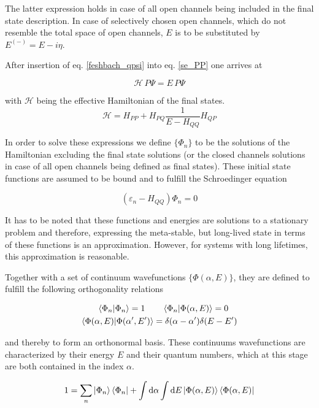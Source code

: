 The latter expression holds in case of all open channels being included
in the final state description.
In case of selectively chosen open channels, which do not resemble the total
space of open channels,
$E$ is to be substituted by $E^{(-)}=E - i\eta$.

After insertion of eq. \ref{feshbach_qpsi} into eq. \ref{se_PP} one arrives at

\begin{equation}
  \mathscr{H} \,P \Psi = E \,P \Psi \label{se_ppsi}
\end{equation}

with $\mathscr{H}$ being the effective Hamiltonian of the final states.
\begin{equation}
  \mathscr{H} = H_{PP} + H_{PQ} \frac{1}{E-H_{QQ}} H_{QP}
\end{equation}

In order to solve these expressions we define $\{\Phi_n\}$ to be the solutions
of the Hamiltonian excluding the final state solutions (or the closed channels
solutions in case of all open channels being defined as final states).
These initial state functions are assumed to be bound and to fulfill the
Schroedinger equation

\begin{equation}
  (\varepsilon_n - H_{QQ}) \Phi_n = 0 
\end{equation}

It has to be noted that these functions and energies are solutions to a stationary
problem and therefore, expressing the meta-stable, but long-lived state
in terms of these functions is an approximation. However, for systems
with long lifetimes, this approximation is reasonable.

Together with a set of continuum wavefunctions $\{\Phi(\alpha,E)\}$, they are
defined to fulfill the following orthogonality relations

\begin{align}
  \braket{\Phi_n|\Phi_n} = 1 \quad  & \quad \braket{\Phi_n|\Phi(\alpha,E)} = 0\\
  \braket{\Phi(\alpha,E)|\Phi(\alpha',E')} & = \delta(\alpha-\alpha') \delta(E-E')
\end{align}

and thereby to form an orthonormal basis. These continuums wavefunctions
are characterized
by their energy $E$ and their quantum numbers, which at this stage are both
contained
in the index $\alpha$.

\begin{equation}
  1 = \sum\limits_n \ket{\Phi_n}\bra{\Phi_n} + \int \mathrm{d}\alpha \int \mathrm{d}E
      \ket{\Phi(\alpha,E)}\bra{\Phi(\alpha,E)} \label{feshbach_1}
\end{equation}

